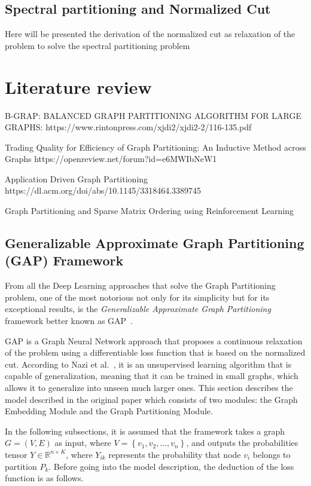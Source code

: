 
\subsection{Spectral partitioning and Normalized Cut}
Here will be presented the derivation of the normalized cut as relaxation of the problem to solve the spectral partitioning problem

\section{Literature review}

B-GRAP: BALANCED GRAPH PARTITIONING ALGORITHM
FOR LARGE GRAPHS:
https://www.rintonpress.com/xjdi2/xjdi2-2/116-135.pdf

Trading Quality for Efficiency of Graph Partitioning: An Inductive Method across Graphs 
https://openreview.net/forum?id=e6MWIbNeW1

Application Driven Graph Partitioning
https://dl.acm.org/doi/abs/10.1145/3318464.3389745

Graph Partitioning and Sparse Matrix Ordering using Reinforcement Learning~\cite{nesteddissection}


\subsection{Generalizable Approximate Graph Partitioning (GAP) Framework}
From all the Deep Learning approaches that solve the Graph Partitioning problem, one of the most notorious not only for its simplicity but for its exceptional results, is the \textit{Generalizable Approximate Graph Partitioning} framework better known as GAP~\cite{gap1}.

GAP is a Graph Neural Network approach that proposes a continuous relaxation of the problem using a differentiable loss function that is based on the normalized cut. According to Nazi et al.~\cite{gap}, it is an unsupervised learning algorithm that is capable of generalization, meaning that it can be trained in small graphs, which allows it to generalize into unseen much larger ones. This section describes the model described in the original paper which consists of two modules: the Graph Embedding Module and the Graph Partitioning Module.

In the following subsections, it is assumed that the framework takes a graph $G = (V, E)$ as input, where $V = \left\{ v_1, v_2, ..., v_n\right\}$, and outputs the probabilities tensor $Y\in \mathbb R^{n\times K}$, where $Y_{ik}$ represents the probability that node $v_i$ belongs to partition $P_k$. %
Before going into the model description, the deduction of the loss function is as follows.

